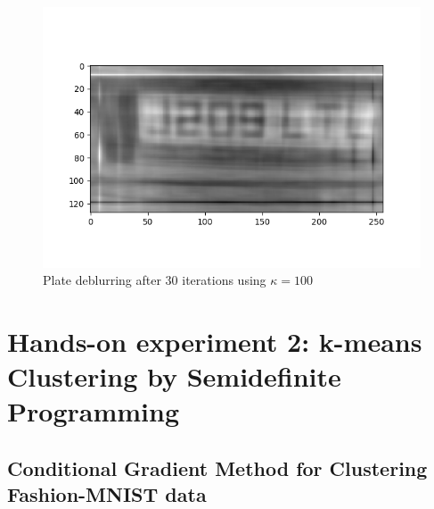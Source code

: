 \documentclass[12pt]{article}
\begin{document}
\begin{figure}[ht]
    \centering
    \includegraphics[width=17cm]{hw4/code/part2/results/100_30iters.png}
    \caption{Plate deblurring after 30 iterations using $\kappa = 100$}
    \label{fig:plate}
\end{figure}

\section{Hands-on experiment 2: k-means Clustering by Semidefinite Programming}

\subsection{Conditional Gradient Method for Clustering Fashion-MNIST data}
\end{document}
